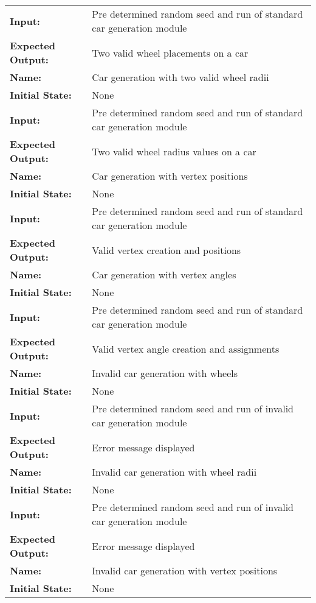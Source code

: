 \documentclass[12pt, titlepage]{article}
\begin{document}
\begin{center}
\begin{longtable}{ l | p{10cm} }
\textbf{Input:} & Pre determined random seed and run of standard car generation module\\
\textbf{Expected Output:} & Two valid wheel placements on a car\\[0.6em]
\hline
\rule{0pt}{1.5em}\textbf{Name:} & Car generation with two valid wheel radii\\
\textbf{Initial State:} & None\\
\textbf{Input:} & Pre determined random seed and run of standard car generation module\\
\textbf{Expected Output:} & Two valid wheel radius values on a car\\[0.6em]
\hline
\rule{0pt}{1.5em}\textbf{Name:} & Car generation with vertex positions\\
\textbf{Initial State:} & None\\
\textbf{Input:} & Pre determined random seed and run of standard car generation module\\
\textbf{Expected Output:} & Valid vertex creation and positions\\[0.6em]
\hline
\rule{0pt}{1.5em}\textbf{Name:} & Car generation with vertex angles\\
\textbf{Initial State:} & None\\
\textbf{Input:} & Pre determined random seed and run of standard car generation module\\
\textbf{Expected Output:} & Valid vertex angle creation and assignments\\[0.6em]
\hline
\rule{0pt}{1.5em}\textbf{Name:} & Invalid car generation with wheels\\
\textbf{Initial State:} & None\\
\textbf{Input:} & Pre determined random seed and run of invalid car generation module\\
\textbf{Expected Output:} & Error message displayed\\[0.6em]
\hline
\rule{0pt}{1.5em}\textbf{Name:} & Invalid car generation with wheel radii\\
\textbf{Initial State:} & None\\
\textbf{Input:} & Pre determined random seed and run of invalid car generation module\\
\textbf{Expected Output:} & Error message displayed\\[0.6em]
\hline
\rule{0pt}{1.5em}\textbf{Name:} & Invalid car generation with vertex positions\\
\textbf{Initial State:} & None\\

\end{longtable}
\end{center}
\end{document}
